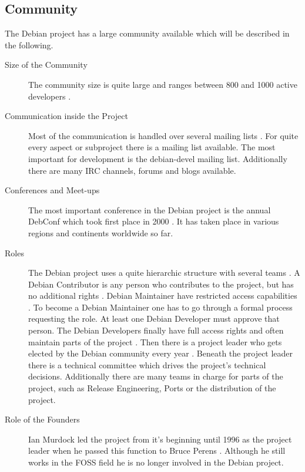 \subsection{Community}

The Debian project has a large community available which will be described in
the following.

\begin{description}

  \item[Size of the Community] The community size is quite large and ranges
    between 800 and 1000 active developers \cite{Perrier2011,DebianOrg}.

  \item[Communication inside the Project] Most of the communication is
    handled over several mailing lists
    \cite{DebianMailingLists,DebianFAQ,DebianNewMembers}. For quite every
    aspect or subproject there is a mailing list available. The most
    important for development is the debian-devel mailing list. Additionally
    there are many \ac{IRC} channels, forums and blogs available.

  \item[Conferences and Meet-ups] The most important conference in the Debian
    project is the annual DebConf which took first place in 2000
    \cite{DebianDebConf}. It has taken place in various regions and
    continents worldwide so far.

  \item[Roles] The Debian project uses a quite hierarchic structure with
    several teams \cite{DebianOrg,Sadowski2008}. A Debian Contributor is any
    person who contributes to the project, but has no additional rights
    \cite{DebianFAQ}. Debian Maintainer have restricted access capabilities
    \cite{DebianMaintainer}. To become a Debian Maintainer one has to go
    through a formal process requesting the role. At least one Debian
    Developer must approve that person. The Debian Developers finally have
    full access rights and often maintain parts of the project
    \cite{DebianDev}. Then there is a project leader who gets elected by the
    Debian community every year \cite{DebianOrg,DebianVoting}. Beneath the
    project leader there is a technical committee which drives the project's
    technical decisions. Additionally there are many teams in charge for
    parts of the project, such as Release Engineering, Ports or the
    distribution of the project.

  \item[Role of the Founders] Ian Murdock led the project from it's beginning
    until 1996 as the project leader when he passed this function to Bruce
    Perens \cite{DebianFAQ,DebianHistory}. Although he still works in the
    \ac{FOSS} field he is no longer involved in the Debian project.

\end{description}

